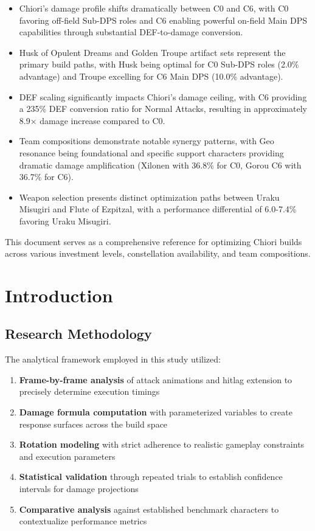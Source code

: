 \documentclass[12pt,a4paper]{article}
\begin{document}
\begin{itemize}
    \item Chiori's damage profile shifts dramatically between C0 and C6, with C0 favoring off-field Sub-DPS roles and C6 enabling powerful on-field Main DPS capabilities through substantial DEF-to-damage conversion.
    
    \item Husk of Opulent Dreams and Golden Troupe artifact sets represent the primary build paths, with Husk being optimal for C0 Sub-DPS roles (2.0\% advantage) and Troupe excelling for C6 Main DPS (10.0\% advantage).
    
    \item DEF scaling significantly impacts Chiori's damage ceiling, with C6 providing a 235\% DEF conversion ratio for Normal Attacks, resulting in approximately 8.9× damage increase compared to C0.
    
    \item Team compositions demonstrate notable synergy patterns, with Geo resonance being foundational and specific support characters providing dramatic damage amplification (Xilonen with 36.8\% for C0, Gorou C6 with 36.7\% for C6).
    
    \item Weapon selection presents distinct optimization paths between Uraku Misugiri and Flute of Ezpitzal, with a performance differential of 6.0-7.4\% favoring Uraku Misugiri.
\end{itemize}

This document serves as a comprehensive reference for optimizing Chiori builds across various investment levels, constellation availability, and team compositions.

\section{Introduction}

\subsection{Research Methodology}

The analytical framework employed in this study utilized:

\begin{enumerate}
    \item \textbf{Frame-by-frame analysis} of attack animations and hitlag extension to precisely determine execution timings
    \item \textbf{Damage formula computation} with parameterized variables to create response surfaces across the build space
    \item \textbf{Rotation modeling} with strict adherence to realistic gameplay constraints and execution parameters
    \item \textbf{Statistical validation} through repeated trials to establish confidence intervals for damage projections
    \item \textbf{Comparative analysis} against established benchmark characters to contextualize performance metrics
\end{enumerate}
\end{document}
